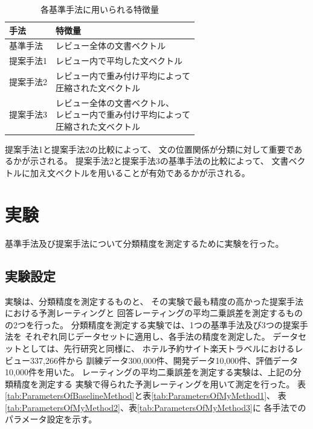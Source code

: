 \documentclass[twocolumn,a4paper]{ltjarticle}
\begin{document}
\begin{table}
  \caption{各基準手法に用いられる特徴量}
  \begin{tabularx}{\linewidth}{l | l}\label{tab:MethodFeatures}
    手法 & 特徴量 \\
    \hline
    基準手法  & レビュー全体の文書ベクトル \\
    提案手法1 & レビュー内で平均した文ベクトル \\
    提案手法2 & \makecell[l]{レビュー内で重み付け平均によって \\
                             圧縮された文ベクトル} \\
    提案手法3 & \makecell[l]{レビュー全体の文書ベクトル、\\
                             レビュー内で重み付け平均によって \\
                             圧縮された文ベクトル} \\
  \end{tabularx}
\end{table}

提案手法1と提案手法2の比較によって、
文の位置関係が分類に対して重要であるかが示される。
提案手法2と提案手法3の基準手法の比較によって、
文書ベクトルに加え文ベクトルを用いることが有効であるかが示される。


\section{実験}

基準手法及び提案手法について分類精度を測定するために実験を行った。


\subsection{実験設定}

実験は、分類精度を測定するものと、
その実験で最も精度の高かった提案手法における予測レーティングと
回答レーティングの平均二乗誤差を測定するものの2つを行った。
分類精度を測定する実験では、1つの基準手法及び3つの提案手法を
それぞれ同じデータセットに適用し、各手法の精度を測定した。
データセットとしては、先行研究\cite{fujitani15}と同様に、
ホテル予約サイト楽天トラベルにおけるレビュー337,266件から
訓練データ300,000件、開発データ10,000件、評価データ10,000件を用いた。
レーティングの平均二乗誤差を測定する実験は、上記の分類精度を測定する
実験で得られた予測レーティングを用いて測定を行った。
表\ref{tab:ParametersOfBaselineMethod}と表\ref{tab:ParametersOfMyMethod1}、
表\ref{tab:ParametersOfMyMethod2}、表\ref{tab:ParametersOfMyMethod3}に
各手法でのパラメータ設定を示す。
\end{document}
